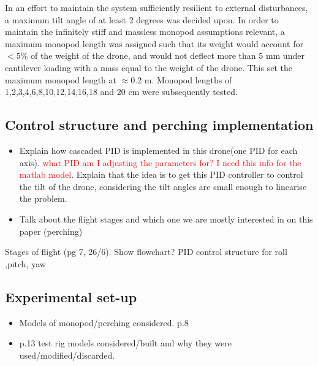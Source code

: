 \documentclass[12pt,a4paper]{article}
\begin{document}
In an effort to maintain the system sufficiently resilient to external disturbances, a maximum tilt angle of at least 2 degrees was decided upon. In order to maintain the infinitely stiff and massless monopod assumptions relevant, a maximum monopod length was assigned such that its weight would account for $<$5\% of the weight of the drone, and would not deflect more than 5 mm under cantilever loading with a mass equal to the weight of the drone. This set the maximum monopod length at $\approx$0.2 m. Monopod lengths of 1,2,3,4,6,8,10,12,14,16,18 and 20 cm were subsequently tested.

\subsection{Control structure and perching implementation}
\begin{itemize}

\item Explain how cascaded PID is implemented in this drone(one PID for each axis). \textcolor{red}{what PID am I adjusting the parameters for? I need this info for the matlab model}. Explain that the idea is to get this PID controller to control the tilt of the drone, considering the tilt angles are small enough to linearise the problem.
\item Talk about the flight stages and which one we are mostly interested in on this paper (perching)
\end{itemize}

Stages of flight (pg 7, 26/6). Show flowchart?
PID control structure for roll ,pitch, yaw



\subsection{Experimental set-up}
\begin{itemize}
\item Models of monopod/perching considered. p.8
\item p.13 test rig models considered/built and why they were used/modified/discarded.
\end{itemize}
\end{document}
